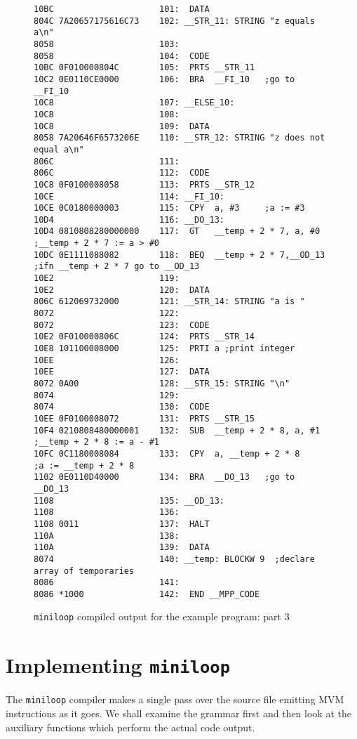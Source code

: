 \begin{figure}
\hspace*{-1cm}
\begin{minipage}{30cm}
\footnotesize
\begin{verbatim}
10BC                     101:  DATA
804C 7A20657175616C73    102: __STR_11: STRING "z equals a\n"
8058                     103: 
8058                     104:  CODE
10BC 0F010000804C        105:  PRTS __STR_11
10C2 0E0110CE0000        106:  BRA  __FI_10   ;go to __FI_10
10C8                     107: __ELSE_10:
10C8                     108: 
10C8                     109:  DATA
8058 7A20646F6573206E    110: __STR_12: STRING "z does not equal a\n"
806C                     111: 
806C                     112:  CODE
10C8 0F0100008058        113:  PRTS __STR_12
10CE                     114: __FI_10:
10CE 0C0180000003        115:  CPY  a, #3     ;a := #3 
10D4                     116: __DO_13:
10D4 0810808280000000    117:  GT   __temp + 2 * 7, a, #0     ;__temp + 2 * 7 := a > #0
10DC 0E1111088082        118:  BEQ  __temp + 2 * 7,__OD_13    ;ifn __temp + 2 * 7 go to __OD_13 
10E2                     119: 
10E2                     120:  DATA
806C 612069732000        121: __STR_14: STRING "a is "
8072                     122: 
8072                     123:  CODE
10E2 0F010000806C        124:  PRTS __STR_14
10E8 101100008000        125:  PRTI a ;print integer
10EE                     126: 
10EE                     127:  DATA
8072 0A00                128: __STR_15: STRING "\n"
8074                     129: 
8074                     130:  CODE
10EE 0F0100008072        131:  PRTS __STR_15
10F4 0210808480000001    132:  SUB  __temp + 2 * 8, a, #1     ;__temp + 2 * 8 := a - #1
10FC 0C1180008084        133:  CPY  a, __temp + 2 * 8         ;a := __temp + 2 * 8 
1102 0E0110D40000        134:  BRA  __DO_13   ;go to __DO_13
1108                     135: __OD_13:
1108                     136: 
1108 0011                137:  HALT
110A                     138: 
110A                     139:  DATA
8074                     140: __temp: BLOCKW 9  ;declare array of temporaries
8086                     141: 
8086 *1000               142:  END __MPP_CODE
\end{verbatim}
\end{minipage}
\caption{{\tt miniloop} compiled output for the example program: part 3}
\label{miniloop:assembler3}
\end{figure}

\section{Implementing {\tt miniloop}}
The {\tt miniloop} compiler makes a single pass over the source file emitting MVM 
instructions as it goes. We shall examine the grammar first and then look at the
auxiliary functions which perform the actual code output.

